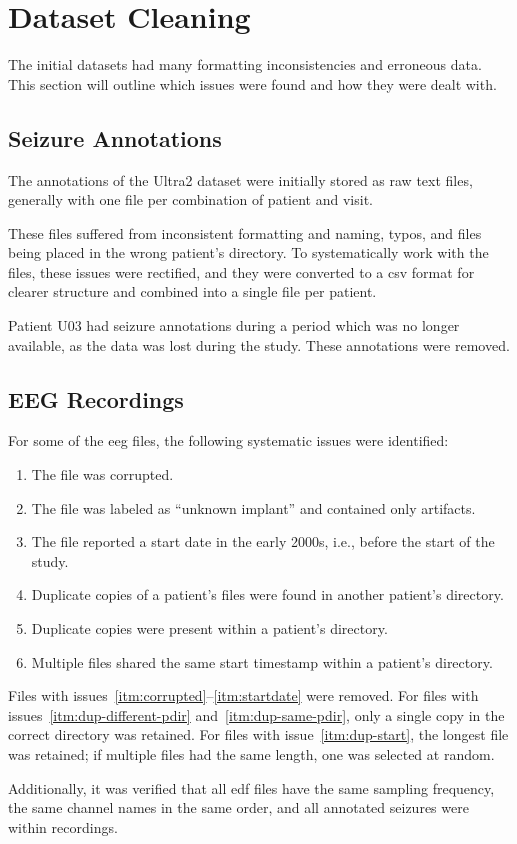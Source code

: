 \section{Dataset Cleaning}\label{sec:dataset-cleaning}
The initial datasets had many formatting inconsistencies and erroneous data.
This section will outline which issues were found and how they were dealt with.

\subsection{Seizure Annotations}\label{subsec:seizure-annotations}
The annotations of the Ultra2 dataset were initially stored as raw text files, generally with one file per combination of patient and visit.

These files suffered from inconsistent formatting and naming, typos, and files being placed in the wrong patient's directory.
To systematically work with the files, these issues were rectified, and they were converted to a \gls{csv} format for clearer structure and combined into a single file per patient.

Patient U03 had seizure annotations during a period which was no longer available, as the data was lost during the study.
These annotations were removed.

\subsection{EEG Recordings}\label{subsec:eeg-recordings}

For some of the \gls{eeg} files, the following systematic issues were identified:
\begin{enumerate}
    \item \label{itm:corrupted} The file was corrupted.
    \item \label{itm:unknown} The file was labeled as ``unknown implant'' and contained only artifacts.
    \item \label{itm:startdate} The file reported a start date in the early 2000s, i.e., before the start of the study.
    \item \label{itm:dup-different-pdir} Duplicate copies of a patient's files were found in another patient's directory.
    \item \label{itm:dup-same-pdir} Duplicate copies were present within a patient's directory.
    \item \label{itm:dup-start} Multiple files shared the same start timestamp within a patient's directory.
\end{enumerate}

Files with issues~\ref{itm:corrupted}--\ref{itm:startdate} were removed.
For files with issues~\ref{itm:dup-different-pdir} and~\ref{itm:dup-same-pdir}, only a single copy in the correct directory was retained.
For files with issue~\ref{itm:dup-start}, the longest file was retained; if multiple files had the same length, one was selected at random.

Additionally, it was verified that all \gls{edf} files have the same sampling frequency, the same channel names in the same order, and all annotated seizures were within recordings.

